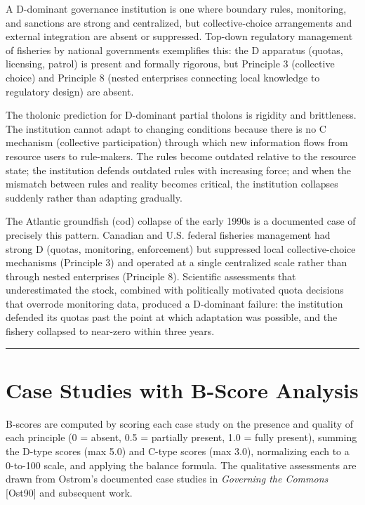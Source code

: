 \documentclass[12pt]{article}
\begin{document}
A D-dominant governance institution is one where boundary rules,
monitoring, and sanctions are strong and centralized, but
collective-choice arrangements and external integration are absent or
suppressed. Top-down regulatory management of fisheries by national
governments exemplifies this: the D apparatus (quotas, licensing,
patrol) is present and formally rigorous, but Principle 3 (collective
choice) and Principle 8 (nested enterprises connecting local knowledge
to regulatory design) are absent.

The tholonic prediction for D-dominant partial tholons is rigidity and
brittleness. The institution cannot adapt to changing conditions because
there is no C mechanism (collective participation) through which new
information flows from resource users to rule-makers. The rules become
outdated relative to the resource state; the institution defends
outdated rules with increasing force; and when the mismatch between
rules and reality becomes critical, the institution collapses suddenly
rather than adapting gradually.

The Atlantic groundfish (cod) collapse of the early 1990s is a
documented case of precisely this pattern. Canadian and U.S. federal
fisheries management had strong D (quotas, monitoring, enforcement) but
suppressed local collective-choice mechanisms (Principle 3) and operated
at a single centralized scale rather than through nested enterprises
(Principle 8). Scientific assessments that underestimated the stock,
combined with politically motivated quota decisions that overrode
monitoring data, produced a D-dominant failure: the institution defended
its quotas past the point at which adaptation was possible, and the
fishery collapsed to near-zero within three years.

\begin{center}\rule{0.5\linewidth}{0.5pt}\end{center}

\section{Case Studies with B-Score Analysis}\label{case-studies-with-b-score-analysis}

B-scores are computed by scoring each case study on the presence and
quality of each principle (0 = absent, 0.5 = partially present, 1.0 =
fully present), summing the D-type scores (max 5.0) and C-type scores
(max 3.0), normalizing each to a 0-to-100 scale, and applying the
balance formula. The qualitative assessments are drawn from Ostrom's
documented case studies in \emph{Governing the Commons} {[}Ost90{]} and
subsequent work.
\end{document}
